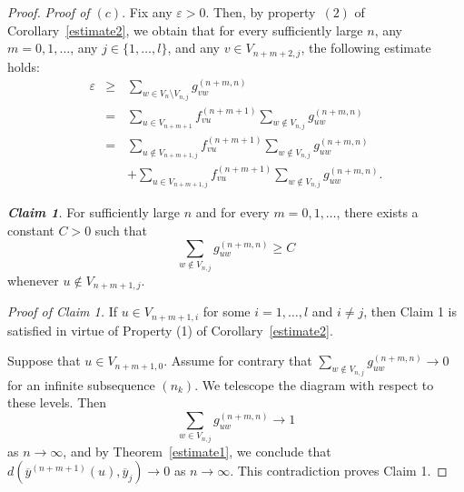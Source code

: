 \documentclass[11pt, english, reqno]{amsart}
\theoremstyle{definition}
\theoremstyle{remark}
\theoremstyle{plain}
\def\ov{\overline}
\numberwithin{equation}{section}
\begin{document}
{\begin{proof}
\textit{Proof of $(c)$}. Fix any $\varepsilon > 0$.
Then, by property~$(2)$ of Corollary~\ref{estimate2}, we obtain that
 for every sufficiently large $n$, any $m = 0,1,\ldots$, any $j \in
 \{1,\ldots, l\}$,  and any $v \in V_{n+m+2,j}$, the following estimate
 holds:
\begin{eqnarray}\label{4}\nonumber
\varepsilon  & \geq & \sum_{w \in V_n \setminus
V_{n,j}} g_{v w}^{(n+m,n)}\\ \nonumber
& =&  \sum_{u \in V_{n+m+1}}f_{vu}^{(n+m+1)} \sum_{w \notin V_{n,j}}
 g_{uw}^{(n+m,n)} \\
&=  &\sum_{u \notin V_{n+m+1,j}}f_{vu}^{(n+m+1)} \sum_{w \notin
 V_{n,j}}g_{uw}^{(n+m,n)}\\
&   \ \ \ \ & + \sum_{u \in V_{n+m+1,j}}f_{vu}^{(n+m+1)} \sum_{w
\notin V_{n,j}}g_{uw}^{(n+m,n)}. \nonumber
\end{eqnarray}

\medskip
\textit{\textbf{Claim 1}.} For sufficiently large $n$  and for every $m =
0,1, \ldots$, there exists a constant $C > 0$ such that
\begin{equation}\label{5}
\sum_{w \notin V_{n,j}}g_{uw}^{(n+m,n)} \geq C
\end{equation}
whenever $u \notin V_{n+m+1,j}$.

\textit{Proof of Claim 1.} If $u \in V_{n+m+1,i}$ for some $i = 1,\ldots,l$
and $i \neq j$, then Claim 1 is satisfied in virtue of  Property (1) of
 Corollary~\ref{estimate2}.

Suppose that $u \in V_{n+m+1,0}$. Assume for contrary that
$\sum_{w \notin V_{n,j}}g_{uw}^{(n+m,n)}\to 0 $ for an infinite
subsequence $(n_k)$.
We telescope the diagram with respect to these levels.
 Then
 $$\sum_{w \in V_{n,j}}g_{uw}^{(n+m,n)} \to 1
 $$ as $n \rightarrow   \infty$,  and by
 Theorem~\ref{estimate1}, we conclude that
 $d(\ov y^{(n+m+1)}(u), \ov y_j)\rightarrow
 0$  as  $n\to \infty$. This contradiction proves   Claim 1.
 \medskip


\end{proof}}
\end{document}
